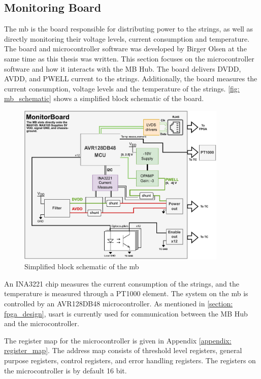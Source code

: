 \documentclass[main.tex]{subfiles}
\begin{document}
\subsection{Monitoring Board}
\label{ssec: microcontroller}
The \acrlong{mb} is the board responsible for distributing power to the strings, as well as directly monitoring their voltage levels, current consumption and temperature. The board and microcontroller software was developed by Birger Olsen at the same time as this thesis was written. This section focuses on the microcontroller software and how it interacts with the MB Hub. The board delivers DVDD, AVDD, and PWELL current to the strings. Additionally, the board measures the current consumption, voltage levels and the temperature of the strings. \autoref{fig: mb_schematic} shows a simplified block schematic of the board.

\begin{figure}[!htpb]
    \centering
    \includegraphics[width=10cm, scale=1]{images/MonitorBoardBlockSchematic.pdf}
    \caption{Simplified block schematic of the \acrfull{mb}\cite{birger}}
    \label{fig: mb_schematic}
\end{figure}
\FloatBarrier

 An INA3221 chip measures the current consumption of the strings, and the temperature is measured through a PT1000 element. The system on the \gls{mb} is controlled by an AVR128DB48 microcontroller. As mentioned in \autoref{section: fpga_design}, \acrshort{usart} is currently used for communication between the MB Hub and the microcontroller.

The register map for the microcontroller is given in Appendix \ref{appendix: register_map}. The address map consists of threshold level registers, general purpose registers, control registers, and error handling registers. The registers on the microcontroller is by default 16 bit.
\end{document}
